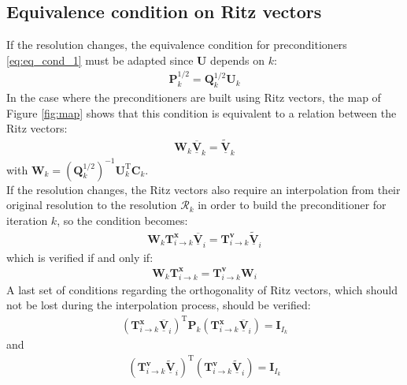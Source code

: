 \documentclass[12pt]{scrartcl}
\begin{document}
\subsection{Equivalence condition on Ritz vectors}
If the resolution changes, the equivalence condition for preconditioners \eqref{eq:eq_cond_1} must be adapted since $\mathbf{U}$ depends on $k$:
\begin{align}
\mathbf{P}^{1/2}_k = \mathbf{Q}^{1/2}_k \mathbf{U}_k
\end{align}
In the case where the preconditioners are built using Ritz vectors, the map of Figure \ref{fig:map} shows that this condition is equivalent to a relation between the Ritz vectors:
\begin{align}
\mathbf{W}_k\underline{\overline{\mathbf{V}}}_k = \underline{\widetilde{\mathbf{V}}}_k
\end{align}
with $\mathbf{W}_k = \left(\mathbf{Q}^{1/2}_k\right)^{-1} \mathbf{U}^\mathrm{T}_k \mathbf{C}_k$.\\

If the resolution changes, the Ritz vectors also require an interpolation from their original resolution to the resolution $\mathcal{R}_k$ in order to build the preconditioner for iteration $k$, so the condition becomes: 
\begin{align}
\mathbf{W}_k \mathbf{T}^\mathbf{x}_{i \rightarrow k} \underline{\overline{\mathbf{V}}}_i = \mathbf{T}^\mathbf{v}_{i \rightarrow k} \underline{\widetilde{\mathbf{V}}}_i
\end{align}
which is verified if and only if:
\begin{align}
\label{eq:eq_cond_3}
\mathbf{W}_k \mathbf{T}^\mathbf{x}_{i \rightarrow k} = \mathbf{T}^\mathbf{v}_{i \rightarrow k} \mathbf{W}_i
\end{align}
A last set of conditions regarding the orthogonality of Ritz vectors, which should not be lost during the interpolation process, should be verified:
\begin{align}
\label{eq:eq_cond_4}
\left(\mathbf{T}^\mathbf{x}_{i \rightarrow k} \underline{\overline{\mathbf{V}}}_i\right)^\mathrm{T} \mathbf{P}_k\left(\mathbf{T}^\mathbf{x}_{i \rightarrow k} \underline{\overline{\mathbf{V}}}_i\right) = \mathbf{I}_{I_k}
\end{align}
and
\begin{align}
\label{eq:eq_cond_5}
\left(\mathbf{T}^\mathbf{v}_{i \rightarrow k} \underline{\widetilde{\mathbf{V}}}_i\right)^\mathrm{T} \left(\mathbf{T}^\mathbf{v}_{i \rightarrow k} \underline{\widetilde{\mathbf{V}}}_i\right) = \mathbf{I}_{I_k}
\end{align}
\end{document}
